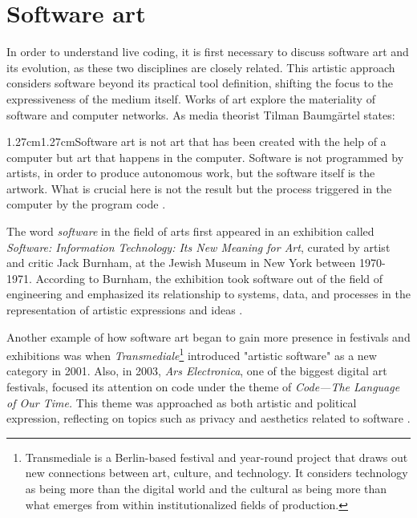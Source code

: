 \documentclass[12pt, twoside, a4paper]{report}
\begin{document}

\section{Software art }


In order to understand live coding, it is first necessary to discuss software art and its evolution, as these two disciplines are closely related.  This artistic approach considers software beyond its practical tool definition, shifting the focus to the expressiveness of the medium itself. Works of art explore the materiality of software and computer networks. As media theorist Tilman Baumgärtel states:

\begin{adjustwidth}{1.27cm}{1.27cm}Software art is not art that has been created with the help of a
computer but art that happens in the computer. Software is not
programmed by artists, in order to produce autonomous work,
but the software itself is the artwork. What is crucial here is not
the result but the process triggered in the computer by the
program  code \citep [p.1--2]{baumgartel2001experimentelle}.
\end{adjustwidth}


The word \textit{software} in the field of arts first appeared in an exhibition called \textit{Software: Information Technology: Its New Meaning for Art}, curated by artist and critic Jack Burnham, at the Jewish Museum in New York between 1970-1971. According to Burnham, the exhibition took software out of the field of engineering and emphasized its relationship to systems, data, and processes in the representation of artistic expressions and ideas \citep{katz1970software}.

Another example of how software art began to gain more presence in festivals and exhibitions was when \textit{Transmediale}\footnote{Transmediale is a Berlin-based festival and year-round project that draws out new connections between art, culture, and technology. It considers technology as being more than the digital world and the cultural as being more than what emerges from within institutionalized fields of production.} introduced "artistic software" as a new category in 2001.  Also, in 2003, \textit{Ars Electronica}, one of the biggest digital art festivals, focused its attention on code under the theme of \textit{Code—The Language of Our Time.} This theme was approached as both artistic and political expression, reflecting on topics such as privacy and aesthetics related to software \citep{broeckmann2006software}.
\end{document}
